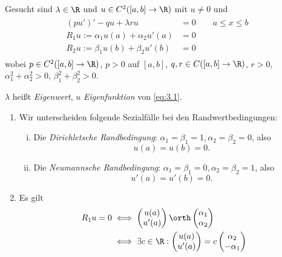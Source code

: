 \begin{df} \label{3.6}
	Gesucht sind $\lambda \in \R$ und $u \in C^2([a,b]\to \R)$ mit $u \neq 0$ und
	\begin{align} \label{eq:3.1}
		\begin{aligned}
		(pu')' - qu + \lambda ru &= 0 \qquad a\le x \le b \\
		R_1 u := \alpha_1 u(a) + \alpha_2 u'(a) &= 0 \\
		R_2 u := \beta_1 u(b) + \beta_2 u'(b) &= 0
		\end{aligned}
	\end{align}
	wobei $p \in C^2([a,b] \to \R)$, $p > 0$ auf $[a,b]$, $q,r \in C([a,b] \to \R)$, $r>0$, $\alpha_1^2 + \alpha_2^2 > 0$, $\beta_1^2 + \beta_2^2 > 0$.

	$\lambda$ heißt \emph{Eigenwert}, $u$ \emph{Eigenfunktion} von \ref{eq:3.1}.
\end{df}

\begin{nt} \label{3.7}
	\begin{enumerate}[1)]
		\item
			Wir unterscheiden folgende Sezialfälle bei den Randwertbedingungen:
			\begin{enumerate}[i)]
				\item
					Die \emph{Dirichletsche Randbedingung}: $\alpha_1 = \beta_1 = 1, \alpha_2 = \beta_2 = 0$, also
					\[
						u(a) = u(b) = 0.
					\]
				\item
					Die \emph{Neumannsche Randbedingung}: $\alpha_1 = \beta_1 = 0, \alpha_2 = \beta_2 = 1$, also
					\[
						u'(a) = u'(b) = 0.
					\]
			\end{enumerate}
		\item
			Es gilt
			\begin{align*}
				R_1 u = 0
				&\iff \begin{pmatrix}
					u(a) \\ u'(a) 
				\end{pmatrix} \orth \begin{pmatrix}
					\alpha_1 \\ \alpha_2
				\end{pmatrix} \\
				&\iff \exists c \in \R : \begin{pmatrix}
					u(a) \\ u'(a)
				\end{pmatrix} = c \begin{pmatrix}
					\alpha_2 \\ -\alpha_1
				\end{pmatrix}
			\end{align*}


	\end{enumerate}
\end{nt}

